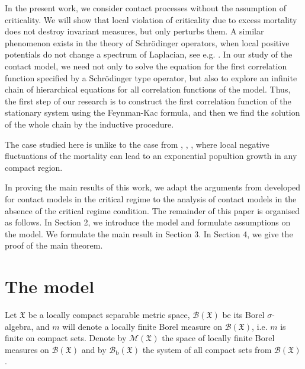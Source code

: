 \documentclass[a4paper,12pt]{article}
\newcommand{\XXX}{{\mathfrak{X}}}
\newcommand{\B}{\mathcal{B}}
\newcommand{\M}{\mathcal{M}}
\begin{document}
In the present work, we consider contact processes without the assumption of criticality.
We will show that local violation of criticality due to excess mortality does not destroy invariant measures, but only perturbs them. A similar phenomenon exists in the theory of Schr\"{o}dinger operators, when local positive potentials do not change a spectrum of Laplacian, see e.g. \cite[Chapter 13]{RS4}. %
In our study of the contact model, we need not only to solve the equation for the first correlation function specified by a  Schr\"{o}dinger type operator, but also to explore an infinite chain of hierarchical equations for all correlation functions of the model. Thus, the first step of our research is to construct the first correlation function of the stationary system using the Feynman-Kac formula, and then we find  the solution of the whole chain by the inductive procedure.


The case studied here is unlike to the case from \cite{BPZ1}, \cite{BPZ2}, \cite{KMPZ}, where local negative fluctuations of the mortality can lead to an exponential popultion growth in any compact region.


In proving the main results of this work, we adapt the arguments from \cite{KKP, KPZh, PZ-EJP} developed for contact models in the critical regime to the analysis of contact models in the absence of the critical regime condition.
The remainder of this paper is organised as follows. In Section 2, we introduce the model and formulate assumptions on the model. We formulate the main result in Section 3. In Section 4, we give the proof of the main theorem.


\section{The model}



Let $\XXX$ be a locally compact separable metric space, ${\B}({\XXX})$ be its Borel $\sigma$-algebra,
and $m$ will denote a locally finite  Borel measure on ${\B} (\XXX)$, i.e. $m$ is finite on compact sets.
Denote by $\M(\XXX)$ the space of locally finite Borel measures on $\B(\XXX)$ and by ${\B}_{\mathrm{b}} ({\XXX})$
the system of all compact sets from ${\B}({\XXX})$.
\end{document}
